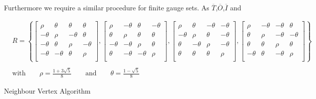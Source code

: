 Furthermore we require a similar procedure for finite gauge sets. As $\overline{T} $,$\overline{O}$,$\overline{I}$ and




\begin{align*}
  & R = \left\{
 \begin{bmatrix}
  \rho    & \theta  & \theta  & \theta  \\
  -\theta & \rho    & -\theta & \theta  \\
  -\theta & \theta  & \rho    & -\theta \\
  -\theta & -\theta & \theta  & \rho    \\
 \end{bmatrix},
 \begin{bmatrix}
  \rho    & -\theta & \theta  & -\theta \\
  \theta  & \rho    & \theta  & \theta  \\
  -\theta & -\theta & \rho    & \theta  \\
  \theta  & -\theta & -\theta & \rho    \\
 \end{bmatrix},
 \begin{bmatrix}
  \rho    & \theta  & -\theta & -\theta \\
  -\theta & \rho    & \theta  & -\theta \\
  \theta  & -\theta & \rho    & -\theta \\
  \theta  & \theta  & \theta  & \rho    \\
 \end{bmatrix},
 \begin{bmatrix}
  \rho    & -\theta & -\theta & \theta  \\
  \theta  & \rho    & -\theta & -\theta \\
  \theta  & \theta  & \rho    & \theta  \\
  -\theta & \theta  & -\theta & \rho    \\
 \end{bmatrix}
 \right\}                                                                                                        \\\\
  & \textrm{with} \qquad \rho = \frac{1 + 3\sqrt{5}}{8} \qquad \textrm{and} \qquad \theta = \frac{1-\sqrt{5}}{8}
\end{align*}





\begin{algorithm}[!htb]
 \caption{Neighbour Vertex Algorithm}
 \label{alg:metroMonte}
 \begin{algorithmic}[1]
  \ENDIF
 \end{algorithmic}
\end{algorithm}




